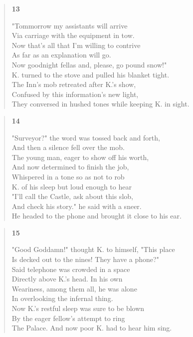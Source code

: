 \documentclass{article}
\begin{document}
\begin{verse}
  \begin{center}
    \textbf{13} \\
  \end{center}
  "Tommorrow my assistants will arrive \\
  Via carriage with the equipment in tow. \\
  Now that's all that I'm willing to contrive \\
  As far as an explanation will go. \\
  Now goodnight fellas and, please, go pound snow!" \\
  K. turned to the stove and pulled his blanket tight. \\
  The Inn's mob retreated after K.'s show, \\
  Confused by this information's new light, \\
  They conversed in hushed tones while keeping K. in sight.
\end{verse}
\begin{verse}
  \begin{center}
    \textbf{14} \\
  \end{center}
  "Surveyor?" the word was tossed back and forth, \\
  And then a silence fell over the mob. \\
  The young man, eager to show off his worth, \\
  And now determined to finish the job, \\
  Whispered in a tone so as not to rob \\
  K. of his sleep but loud enough to hear \\
  "I'll call the Castle, ask about this slob, \\
  And check his story." he said with a sneer. \\
  He headed to the phone and brought it close to his ear.
\end{verse}
\begin{verse}
  \begin{center}
    \textbf{15} \\
  \end{center}
  "Good Goddamn!" thought K. to himself, "This place \\
  Is decked out to the nines! They have a phone?" \\
  Said telephone was crowded in a space \\
  Directly above K.'s head. In his own \\
  Weariness, among them all, he was alone \\
  In overlooking the infernal thing. \\
  Now K.'s restful sleep was sure to be blown \\
  By the eager fellow's attempt to ring \\
  The Palace. And now poor K. had to hear him sing.
\end{verse}
\end{document}
